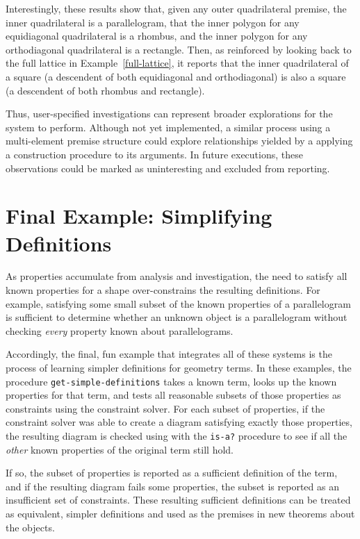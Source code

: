 Interestingly, these results show that, given any outer quadrilateral
premise, the inner quadrilateral is a parallelogram, that the inner
polygon for any equidiagonal quadrilateral is a rhombus, and the inner
polygon for any orthodiagonal quadrilateral is a rectangle. Then, as
reinforced by looking back to the full lattice in
Example~\ref{full-lattice}, it reports that the inner quadrilateral of
a square (a descendent of both equidiagonal and orthodiagonal) is also a
square (a descendent of both rhombus and rectangle).


Thus, user-specified investigations can represent broader explorations
for the system to perform.  Although not yet implemented, a similar
process using a multi-element premise structure could explore
relationships yielded by a applying a construction procedure to its
arguments. In future executions, these observations could be marked as
uninteresting and excluded from reporting.

\section{Final Example: Simplifying Definitions}
\label{sec:end-goal-2}

As properties accumulate from analysis and investigation, the need to
satisfy all known properties for a shape over-constrains the resulting
definitions. For example, satisfying some small subset of the known
properties of a parallelogram is sufficient to determine whether an
unknown object is a parallelogram without checking \emph{every}
property known about parallelograms.

Accordingly, the final, fun example that integrates all of these
systems is the process of learning simpler definitions for geometry
terms. In these examples, the procedure
\texttt{get-simple-definitions} takes a known term, looks up the known
properties for that term, and tests all reasonable subsets of those
properties as constraints using the constraint solver. For each subset
of properties, if the constraint solver was able to create a diagram
satisfying exactly those properties, the resulting diagram is checked
using with the \texttt{is-a?} procedure to see if all the \emph{other}
known properties of the original term still hold.

If so, the subset of properties is reported as a sufficient definition
of the term, and if the resulting diagram fails some properties, the
subset is reported as an insufficient set of constraints. These
resulting sufficient definitions can be treated as equivalent, simpler
definitions and used as the premises in new theorems about the
objects.

